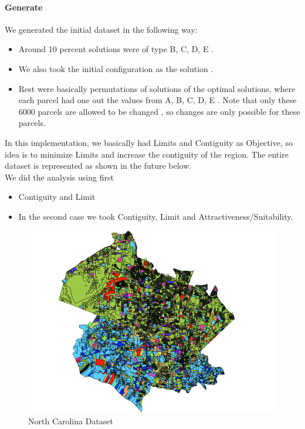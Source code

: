 \documentclass[12pt]{article} %
\begin{document}
\paragraph{Generate} We generated the initial dataset in the following way:
\begin{itemize}
\item Around 10 percent solutions were of type B, C, D, E .
\item We also took the initial configuration as the solution .
\item Rest were basically permutations of solutions of the optimal solutions, where each parcel had one out the values from A, B, C, D, E . Note that only these 6000 parcels are allowed to be changed , so changes are only possible for these parcels.
 \end{itemize}
In this implementation, we basically had Limits and Contiguity as Objective, so idea is to minimize Limits and increase the contiguity of the region. The entire dataset is represented as shown in the future below. \\
We did the analysis using first 
\begin{itemize} \item Contiguity and Limit 
\item  In the second case we took Contiguity, Limit and Attractiveness/Suitability.
\end{itemize}
\begin{figure}[h]
\begin{center}
\includegraphics[width=4.in]{nc.png}
\caption{North Carolina Dataset}
\end{center}
\end{figure}
\end{document}
